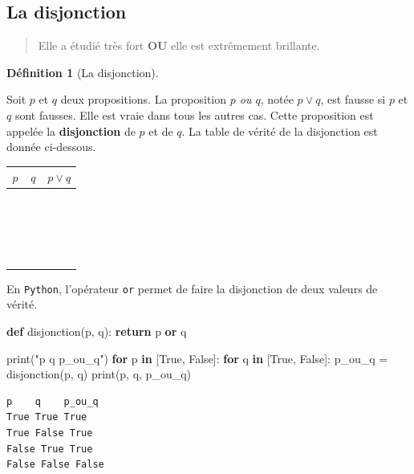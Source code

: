 \documentclass[
  letterpaper,
]{scrbook}
\newenvironment{Shaded}{}{}
\newcommand{\BuiltInTok}[1]{#1}
\newcommand{\ControlFlowTok}[1]{\textcolor[rgb]{0.00,0.44,0.13}{\textbf{#1}}}
\newcommand{\KeywordTok}[1]{\textcolor[rgb]{0.00,0.44,0.13}{\textbf{#1}}}
\newcommand{\NormalTok}[1]{#1}
\newcommand{\OperatorTok}[1]{\textcolor[rgb]{0.40,0.40,0.40}{#1}}
\newcommand{\StringTok}[1]{\textcolor[rgb]{0.25,0.44,0.63}{#1}}
\newcommand{\VariableTok}[1]{\textcolor[rgb]{0.10,0.09,0.49}{#1}}
\theoremstyle{definition}
\theoremstyle{definition}
\newtheorem{definition}{Définition}[chapter]
\theoremstyle{plain}
\theoremstyle{remark}
\begin{document}
\hypertarget{la-disjonction}{%
\subsection{La disjonction}\label{la-disjonction}}

\begin{quote}
Elle a étudié très fort \textbf{OU} elle est extrêmement brillante.
\end{quote}

\leavevmode{}%
\begin{definition}[La disjonction]\label{def-disjonction}

Soit \(p\) et \(q\) deux propositions. La proposition \emph{\(p\) ou
\(q\)}, notée \(p\vee q\), est fausse si \(p\) et \(q\) sont fausses.
Elle est vraie dans tous les autres cas. Cette proposition est appelée
la \textbf{disjonction} de \(p\) et de \(q\). La table de vérité de la
disjonction est donnée ci-dessous.

\begin{longtable}[]{@{}ccc@{}}
\toprule()
\(p\) & \(q\) & \(p \vee q\) \\
\midrule()
\endhead
\(\phantom{V}\) & \(\phantom{V}\) & \(\phantom{V}\) \\
\(\phantom{V}\) & \(\phantom{V}\) & \(\phantom{V}\) \\
\(\phantom{V}\) & \(\phantom{V}\) & \(\phantom{V}\) \\
\(\phantom{V}\) & \(\phantom{V}\) & \(\phantom{V}\) \\
\bottomrule()
\end{longtable}

En \texttt{Python}, l'opérateur \texttt{or} permet de faire la
disjonction de deux valeurs de vérité.

\hypertarget{disjonction-python}{}
\begin{Shaded}
\begin{Highlighting}[]
\KeywordTok{def}\NormalTok{ disjonction(p, q):}
    \ControlFlowTok{return}\NormalTok{ p }\KeywordTok{or}\NormalTok{ q}

\BuiltInTok{print}\NormalTok{(}\StringTok{"p    q    p\_ou\_q"}\NormalTok{)}
\ControlFlowTok{for}\NormalTok{ p }\KeywordTok{in}\NormalTok{ [}\VariableTok{True}\NormalTok{, }\VariableTok{False}\NormalTok{]:}
    \ControlFlowTok{for}\NormalTok{ q }\KeywordTok{in}\NormalTok{ [}\VariableTok{True}\NormalTok{, }\VariableTok{False}\NormalTok{]:}
\NormalTok{        p\_ou\_q }\OperatorTok{=}\NormalTok{ disjonction(p, q)}
        \BuiltInTok{print}\NormalTok{(p, q, p\_ou\_q)}
\end{Highlighting}
\end{Shaded}

\begin{verbatim}
p    q    p_ou_q
True True True
True False True
False True True
False False False
\end{verbatim}

\end{definition}
\end{document}
